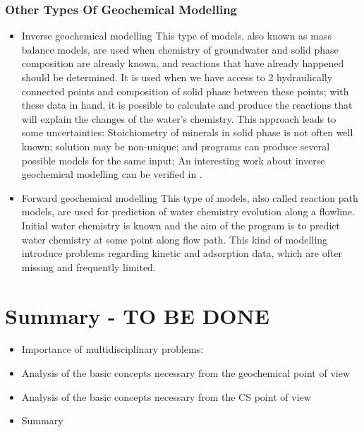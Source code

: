\documentclass[ppgc,mestrado,english]{iiufrgs}
\begin{document}
\subsubsection{Other Types Of Geochemical Modelling}
\begin{itemize}
\item Inverse geochemical modelling
This type of models, also known as mass balance models, are used when chemistry of groundwater and solid phase composition are already known, and reactions that have already happened should be determined. It is used when we have access to 2 hydraulically connected points and composition of solid phase between these points; with these data in hand, it is possible to calculate and produce the reactions that will explain the changes of the water's chemistry. This approach leads to some uncertainties: Stoichiometry of minerals in solid phase is not often well known; solution may be non-unique; and programs can produce several possible models for the same input;
An interesting work about inverse geochemical modelling can be verified in \cite{Sharif:07}.
\item Forward geochemical modelling
This type of models, also called reaction path models, are used for prediction of water chemistry evolution along a flowline. Initial water chemistry is known and the aim of the program is to predict water chemistry at some point along flow path. This kind of modelling introduce problems regarding kinetic and adsorption data, which are ofter missing and frequently limited. 
\end{itemize}

\section{Summary - TO BE DONE}
\begin{itemize}
\item Importance of multidisciplinary problems:
\item  Analysis of the basic concepts necessary from the geochemical point of view
\item Analysis of the basic concepts necessary from the CS point of view
\item Summary
\end{itemize}


\end{document}
